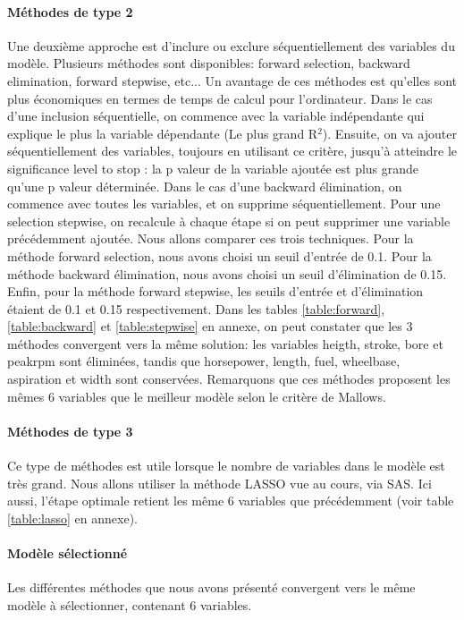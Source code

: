 \documentclass[11pt,a4paper]{article}
\begin{document}
\paragraph{Méthodes de type 2}Une deuxième approche est d'inclure ou exclure séquentiellement des variables du modèle. Plusieurs méthodes sont disponibles: forward selection, backward elimination, forward stepwise, etc... Un avantage de ces méthodes est qu'elles sont plus économiques en termes de temps de calcul pour l'ordinateur. Dans le cas d'une inclusion séquentielle, on commence avec la variable indépendante qui explique le plus la variable dépendante (Le plus grand R$^{2}$). Ensuite, on va ajouter séquentiellement des variables, toujours en utilisant ce critère, jusqu'à atteindre le significance level to stop : la p valeur de la variable ajoutée est plus grande qu'une p valeur déterminée. Dans le cas d'une backward élimination, on commence avec toutes les variables, et on supprime séquentiellement. Pour une selection stepwise, on recalcule à chaque étape si on peut supprimer une variable précédemment ajoutée. Nous allons comparer ces trois techniques. Pour la méthode forward selection, nous avons choisi un seuil d'entrée de 0.1. Pour la méthode backward élimination, nous avons choisi un seuil d'élimination de 0.15. Enfin, pour la méthode forward stepwise, les seuils d'entrée et d'élimination étaient de 0.1 et 0.15 respectivement. Dans les tables \ref{table:forward}, \ref{table:backward} et \ref{table:stepwise} en annexe, on peut constater que les 3 méthodes convergent vers la même solution: les variables heigth, stroke, bore et peakrpm sont éliminées, tandis que horsepower, length, fuel, wheelbase, aspiration et width sont conservées. Remarquons que ces méthodes proposent les mêmes 6 variables que le meilleur modèle selon le critère de Mallows.

\paragraph{Méthodes de type 3} Ce type de méthodes est utile lorsque le nombre de variables dans le modèle est très grand. Nous allons utiliser la méthode LASSO vue au cours, via SAS. Ici aussi, l'étape optimale retient les même 6 variables que précédemment (voir table \ref{table:lasso} en annexe).



\paragraph{Modèle sélectionné} Les différentes méthodes que nous avons présenté convergent vers le même modèle à sélectionner, contenant 6 variables.
\end{document}
